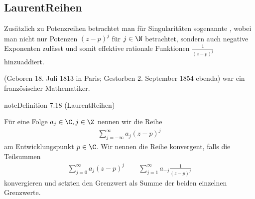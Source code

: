 \documentclass[letterpaper,10pt,german]{jupyterBook}
\begin{document}
\subsection{Laurent\sphinxhyphen{}Reihen}
\label{\detokenize{complexanalysis/residuensatz:laurent-reihen}}
\sphinxAtStartPar
Zusätzlich zu Potenzreihen betrachtet man für Singularitäten sogenannte , wobei man nicht nur Potenzen \((z-p)^j\) für \(j\in \N\) betrachtet, sondern auch negative Exponenten zulässt und somit effektive rationale Funktionen \(\frac{1}{(z-p)^j}\) hinzuaddiert.

\begin{sphinxShadowBox}

\sphinxAtStartPar
{} (Geboren 18. Juli 1813 in Paris; Gestorben 2. September 1854 ebenda) war ein französischer Mathematiker.
\end{sphinxShadowBox}
\label{complexanalysis/residuensatz:definition-2}
\begin{sphinxadmonition}{note}{Definition 7.18 (Laurent\sphinxhyphen{}Reihen)}



\sphinxAtStartPar
Für eine Folge \(a_j\in\C, j\in \Z\) nennen wir die Reihe
\begin{equation*}
\begin{split}\sum_{j=-\infty}^\infty a_j (z-p)^j\end{split}
\end{equation*}
\sphinxAtStartPar
{} am Entwicklungspunkt \(p\in\C\). Wir nennen die Reihe konvergent, falls die Teilsummen
\begin{equation*}
\begin{split}\sum_{j=0}^\infty a_j (z-p)^j\qquad \sum_{j=1}^\infty a_{-j} \frac{1}{(z-p)^j}\end{split}
\end{equation*}
\sphinxAtStartPar
konvergieren und setzten den Grenzwert als Summe der beiden einzelnen Grenzwerte.
\end{sphinxadmonition}
\end{document}
